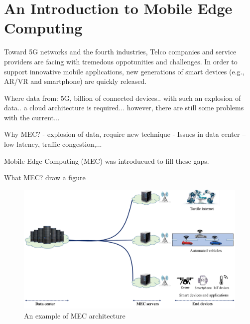 \section{An Introduction to Mobile Edge Computing}  \label{intro}


Toward 5G networks and the fourth industries, Telco companies and service providers are facing with tremedous oppotunities and challenges. In order to support innovative mobile applications, new generations of smart devices (e.g., AR/VR and smartphone) are quickly released.


Where data from: 5G, billion of connected devices.. with  such an explosion of data.. a cloud architecture is required... however, there are still some problems with the current...


Why MEC? 
  - explosion of data, require new technique
  - Issues in data center -- low latency, traffic congestion,...

Mobile Edge Computing (MEC) was introducued to fill these gaps.

What MEC? draw a figure


\begin{figure}[H]
  \begin{center}
   \includegraphics[width=13cm]{./figures/mec-arch.pdf}
   \caption{An example of MEC architecture}
   \label{fig:mec-arch}
   \end{center}
\end{figure}
